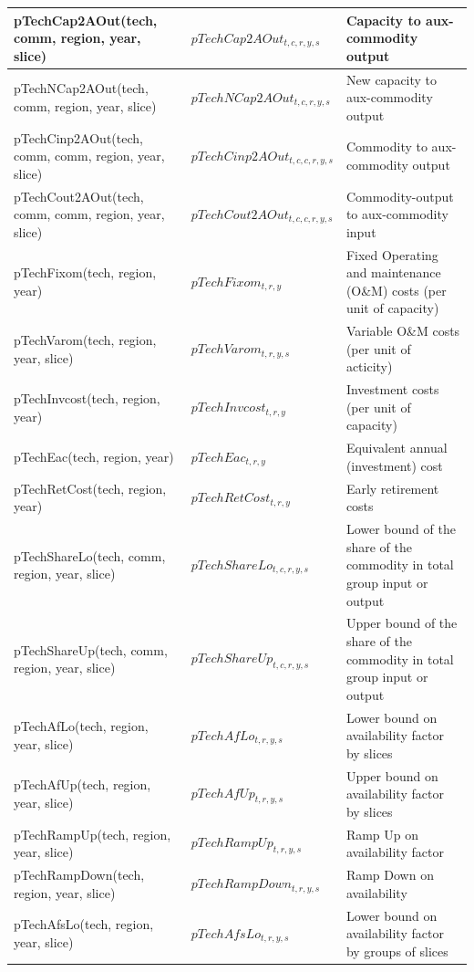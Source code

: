 \documentclass{article}
\begin{document}
\begin{longtable}{|p{10cm}|p{5cm}|p{9cm}|}
 \hline
pTechCap2AOut(tech, comm, region, year, slice) & $pTechCap2AOut_{t,c,r,y,s}$ & Capacity to aux-commodity output \\ 
 \hline
pTechNCap2AOut(tech, comm, region, year, slice) & $pTechNCap2AOut_{t,c,r,y,s}$ & New capacity to aux-commodity output \\ 
 \hline
pTechCinp2AOut(tech, comm, comm, region, year, slice) & $pTechCinp2AOut_{t,c,c,r,y,s}$ & Commodity to aux-commodity output \\ 
 \hline
pTechCout2AOut(tech, comm, comm, region, year, slice) & $pTechCout2AOut_{t,c,c,r,y,s}$ & Commodity-output to aux-commodity input \\ 
 \hline
pTechFixom(tech, region, year) & $pTechFixom_{t,r,y}$ & Fixed Operating and maintenance (O\&M) costs (per unit of capacity) \\ 
 \hline
pTechVarom(tech, region, year, slice) & $pTechVarom_{t,r,y,s}$ & Variable O\&M costs (per unit of acticity) \\ 
 \hline
pTechInvcost(tech, region, year) & $pTechInvcost_{t,r,y}$ & Investment costs (per unit of capacity) \\ 
 \hline
pTechEac(tech, region, year) & $pTechEac_{t,r,y}$ & Equivalent annual (investment) cost \\ 
 \hline
pTechRetCost(tech, region, year) & $pTechRetCost_{t,r,y}$ & Early retirement costs \\ 
 \hline
pTechShareLo(tech, comm, region, year, slice) & $pTechShareLo_{t,c,r,y,s}$ & Lower bound of the share of the commodity in total group input or output \\ 
 \hline
pTechShareUp(tech, comm, region, year, slice) & $pTechShareUp_{t,c,r,y,s}$ & Upper bound of the share of the commodity in total group input or output \\ 
 \hline
pTechAfLo(tech, region, year, slice) & $pTechAfLo_{t,r,y,s}$ & Lower bound on availability factor by slices \\ 
 \hline
pTechAfUp(tech, region, year, slice) & $pTechAfUp_{t,r,y,s}$ & Upper bound on availability factor by slices \\ 
 \hline
pTechRampUp(tech, region, year, slice) & $pTechRampUp_{t,r,y,s}$ & Ramp Up on availability factor \\ 
 \hline
pTechRampDown(tech, region, year, slice) & $pTechRampDown_{t,r,y,s}$ & Ramp Down on availability \\ 
 \hline
pTechAfsLo(tech, region, year, slice) & $pTechAfsLo_{t,r,y,s}$ & Lower bound on availability factor by groups of slices \\ 

\end{longtable}
\end{document}
